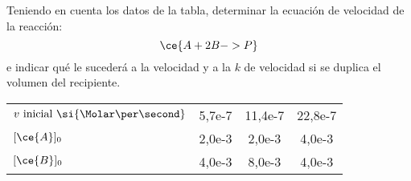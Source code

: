 Teniendo en cuenta los datos de la tabla, determinar la ecuación de velocidad de la reacción:
$$
    \ce{A + 2B -> P}
$$
e indicar qué le sucederá a la velocidad y a la $k$ de velocidad si se duplica el volumen del recipiente.\\
\begin{center}
        \begin{tabular}{lSSS}
        $v~\text{inicial}~\si{\Molar\per\second}$ &
        5,7e-7 &
        11,4e-7 &
        22,8e-7\\
        $[\ce{A}]_0$ &
        2,0e-3 &
        2,0e-3 &
        4,0e-3 \\
        $[\ce{B}]_0$ &
        4,0e-3 &
        8,0e-3 &
        4,0e-3
    \end{tabular}
\end{center}
